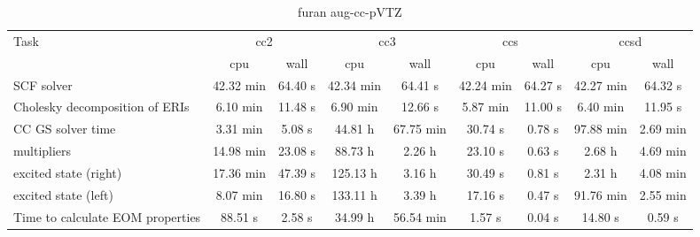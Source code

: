 \documentclass{article}
\begin{document}
\begin{table}
\caption{furan aug-cc-pVTZ}
\begin{tabular}{lcccccccc}
\toprule
Task & \multicolumn{2}{c}{cc2} & \multicolumn{2}{c}{cc3} & \multicolumn{2}{c}{ccs} & \multicolumn{2}{c}{ccsd}\\
\cmidrule(lr){2-3}\cmidrule(lr){4-5}\cmidrule(lr){6-7}\cmidrule(lr){8-9}
 & cpu & wall & cpu & wall & cpu & wall & cpu & wall\\
\midrule
SCF solver & 42.32 min & 64.40 s & 42.34 min & 64.41 s & 42.24 min & 64.27 s & 42.27 min & 64.32 s\\
Cholesky decomposition of ERIs & 6.10 min & 11.48 s & 6.90 min & 12.66 s & 5.87 min & 11.00 s & 6.40 min & 11.95 s\\
CC GS solver time & 3.31 min & 5.08 s & 44.81 h & 67.75 min & 30.74 s & 0.78 s & 97.88 min & 2.69 min\\
multipliers & 14.98 min & 23.08 s & 88.73 h & 2.26 h & 23.10 s & 0.63 s & 2.68 h & 4.69 min\\
excited state (right) & 17.36 min & 47.39 s & 125.13 h & 3.16 h & 30.49 s & 0.81 s & 2.31 h & 4.08 min\\
excited state (left) & 8.07 min & 16.80 s & 133.11 h & 3.39 h & 17.16 s & 0.47 s & 91.76 min & 2.55 min\\
Time to calculate EOM properties & 88.51 s & 2.58 s & 34.99 h & 56.54 min & 1.57 s & 0.04 s & 14.80 s & 0.59 s\\
\bottomrule
\end{tabular}
\end{table}
\end{document}
